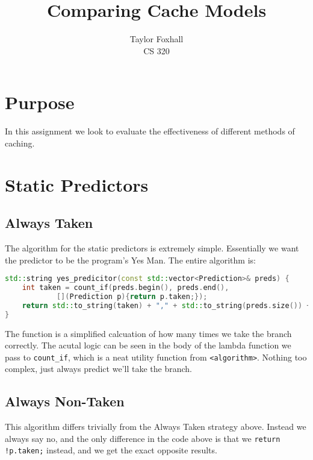 \documentclass[12pt]{article}
\begin{document}
 
\title{Comparing Cache Models}
\author{Taylor Foxhall\\
CS 320}
 
\maketitle
\section{Purpose}
\label{sec:label}

In this assignment we look to evaluate the effectiveness of different methods of
caching.
 
\section{Static Predictors}
\label{sec:label}

\subsection{Always Taken}
\label{subsec:label}

The algorithm for the static predictors is extremely simple. Essentially we want
the predictor to be the program's Yes Man. The entire algorithm is:

\begin{lstlisting}[language=C++, caption=Squirrel!, label=Always Taken]
std::string yes_predicitor(const std::vector<Prediction>& preds) {
    int taken = count_if(preds.begin(), preds.end(),
            [](Prediction p){return p.taken;});
    return std::to_string(taken) + "," + std::to_string(preds.size()) + ";";
}
\end{lstlisting}

The function is a simplified calcuation of how many times we take the
branch correctly. The acutal logic can be seen in the body of the lambda
function we pass to \lstinline|count_if|, which is a neat utility function from
\lstinline|<algorithm>|. Nothing too complex, just always predict we'll take the branch.

\subsection{Always Non-Taken}
\label{sec:label}

This algorithm differs trivially from the Always Taken strategy above. Instead
we always say no, and the only difference in the code above is that we
\lstinline|return !p.taken;| instead, and we get the exact opposite results.
\end{document}
